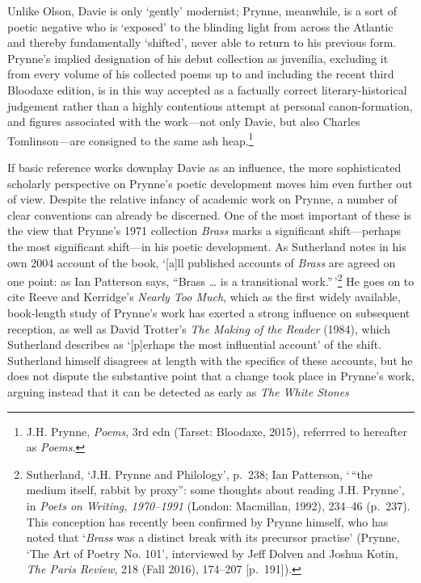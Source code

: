 \documentclass[]{article}
\begin{document}
Unlike Olson, Davie is only `gently' modernist; Prynne, meanwhile, is a
sort of poetic negative who is `exposed' to the blinding light from
across the Atlantic and thereby fundamentally `shifted', never able to
return to his previous form. Prynne's implied designation of his debut
collection as juvenilia, excluding it from every volume of his collected
poems up to and including the recent third Bloodaxe edition, is in this
way accepted as a factually correct literary-historical judgement rather
than a highly contentious attempt at personal canon-formation, and
figures associated with the work---not only Davie, but also Charles
Tomlinson---are consigned to the same ash heap.\footnote{J.H. Prynne,
  \emph{Poems}, 3rd edn (Tarset: Bloodaxe, 2015), referrred to hereafter
  as \emph{Poems}.}

If basic reference works downplay Davie as an influence, the more
sophisticated scholarly perspective on Prynne's poetic development moves
him even further out of view. Despite the relative infancy of academic
work on Prynne, a number of clear conventions can already be discerned.
One of the most important of these is the view that Prynne's 1971
collection \emph{Brass} marks a significant shift---perhaps the most
significant shift---in his poetic development. As Sutherland notes in
his own 2004 account of the book, `{[}a{]}ll published accounts of
\emph{Brass} are agreed on one point: as Ian Patterson says, ``Brass
\ldots{} is a transitional work.''\,'\footnote{Sutherland, `J.H. Prynne
  and Philology', p.~238; Ian Patterson, `\,``the medium itself, rabbit
  by proxy'': some thoughts about reading J.H. Prynne', in \emph{Poets
  on Writing, 1970--1991} (London: Macmillan, 1992), 234--46 (p.~237).
  This conception has recently been confirmed by Prynne himself, who has
  noted that `\emph{Brass} was a distinct break with its precursor
  practise' (Prynne, `The Art of Poetry No. 101', interviewed by Jeff
  Dolven and Joshua Kotin, \emph{The Paris Review}, 218 (Fall 2016),
  174--207 {[}p.~191{]}).} He goes on to cite Reeve and Kerridge's
\emph{Nearly Too Much}, which as the first widely available, book-length
study of Prynne's work has exerted a strong influence on subsequent
reception, as well as David Trotter's \emph{The Making of the Reader}
(1984), which Sutherland describes as `{[}p{]}erhaps the most
influential account' of the shift. Sutherland himself disagrees at
length with the specifics of these accounts, but he does not dispute the
substantive point that a change took place in Prynne's work, arguing
instead that it can be detected as early as \emph{The White Stones}
\end{document}
